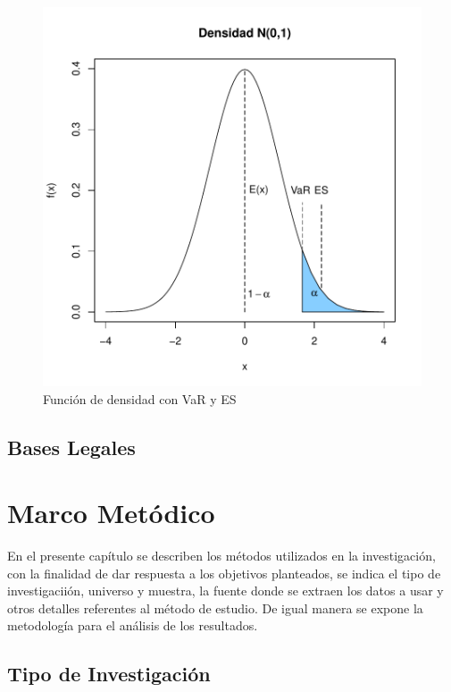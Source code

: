 \documentclass[a4paper,12pt]{Latex/Classes/PhDthesisPSnPDF}
\begin{document}
\begin{figure}[H]
\centering
\includegraphics{main-001}
\caption{Función de densidad con VaR y ES}
\end{figure}

\section{Bases Legales}



\chapter{Marco Metódico}

En el presente capítulo se describen los métodos utilizados en la investigación, con la finalidad de dar respuesta a los objetivos planteados, se indica el tipo de investigaciión, universo y muestra, la fuente donde se extraen los datos a usar y otros detalles referentes al método de estudio. De igual manera se expone la metodología para el análisis de los resultados.

\section{Tipo de Investigación}
\end{document}
